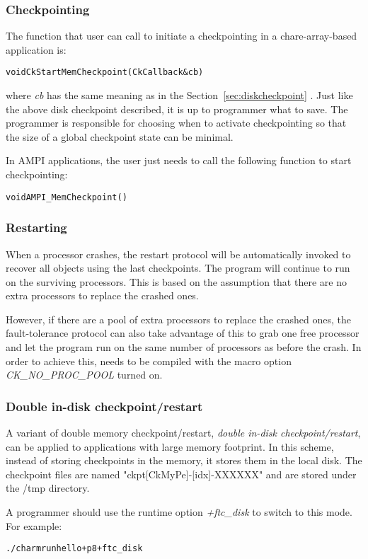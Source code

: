 \subsubsection{Checkpointing}

The function that user can call to initiate a checkpointing in a chare-array-based application is: 

\begin{alltt}
      void CkStartMemCheckpoint(CkCallback &cb)
\end{alltt}

where {\it cb} has the same meaning as in the Section~\ref{sec:diskcheckpoint} .
Just like the above disk checkpoint described, it is up to programmer what to save.
The programmer is responsible for choosing when to activate checkpointing so that
the size of a global checkpoint state can be minimal.

In AMPI applications, the user just needs to call the following function to 
start checkpointing:

\begin{alltt}
      void AMPI_MemCheckpoint()
\end{alltt}

\subsubsection{Restarting}

When a processor crashes, the restart protocol will be automatically
invoked to recover all objects using the last checkpoints. The program
will continue to run on the surviving processors. This is based on the assumption
that there are no extra processors to replace the crashed ones. 

However, if there are a pool of extra processors to replace the crashed ones, 
the fault-tolerance protocol can also take advantage of this to grab one
free processor and let the program run on the same number of processors 
as before the crash. 
In order to achieve this, \charmpp{} needs to be compiled with the macro option
 {\it CK\_NO\_PROC\_POOL} turned on.


\subsubsection{Double in-disk checkpoint/restart}

A variant of double memory checkpoint/restart,
{\it double in-disk checkpoint/restart},
can be applied to applications with large memory footprint.
In this scheme, instead of storing checkpoints in the memory, it stores 
them in the local disk.
The checkpoint files are named "ckpt[CkMyPe]-[idx]-XXXXXX" and are stored under the /tmp directory.

A programmer should use the runtime option {\it +ftc\_disk} to switch to this mode.
For example:

\begin{alltt}
   ./charmrun hello +p8 +ftc_disk
\end{alltt} 


